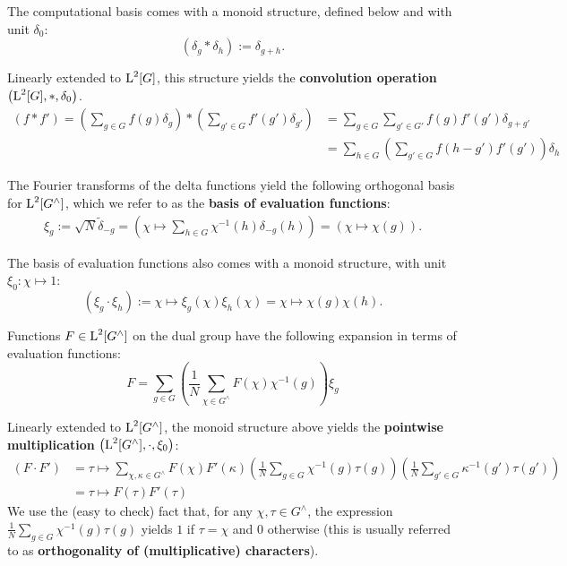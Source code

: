 The computational basis comes with a monoid structure, defined below and with unit $\delta_0$:
\begin{equation}
  \left(\delta_g*\delta_h\right):=\delta_{g+h}.
\end{equation}

Linearly extended to $\operatorname{L}^2[G]$, this structure yields the \textbf{convolution operation} $\left( \operatorname{L}^2[G],*,\delta_0 \right)$.
\begin{align}
\label{eqn:convolutionOperation}
\left(f * f'\right) = \left(\sum_{g\in G} f(g) \delta_g \right) * \left( \sum_{g' \in  G} f'(g') \delta_{g'} \right) &= \sum_{g\in G} \sum_{g'\in G'} f(g) f'(g') \delta_{g+g'} \\ 
&= \sum_{h\in G} \left(\sum_{g'\in G} f(h-g') f'(g')\right) \delta_h
\end{align}

The Fourier transforms of the delta functions yield the following orthogonal basis for $\operatorname{L}^2[G^\wedge]$, which we refer to as the \textbf{basis of evaluation functions}:
\begin{align*}
\xi_{g} := \sqrt{N}\tilde{\delta}_{-g} = \left(\chi \mapsto \sum_{h \in G}\chi^{-1}(h)\delta_{-g}(h) \right)= \left(\chi \mapsto \chi(g)\right).
\end{align*}

The basis of evaluation functions also comes with a monoid structure, with unit $\xi_0: \chi \mapsto 1$:
\begin{equation*}
  \left(\xi_g\cdot\xi_h\right):= \chi \mapsto \xi_g(\chi)\xi_h(\chi) = \chi \mapsto \chi(g)\chi(h).
\end{equation*}

Functions $F \in \operatorname{L}^2[G^\wedge]$ on the dual group have the following expansion in terms of evaluation functions:
\begin{equation*}
  F = \sum_{g\in G} \left( \frac{1}{N}\sum_{\chi \in G^\wedge} F(\chi) \chi^{-1}(g) \right) \xi_g
\end{equation*}

Linearly extended to $\operatorname{L}^2[G^\wedge]$, the monoid structure above yields the \textbf{pointwise multiplication} $\left( \operatorname{L}^2[G^\wedge],\cdot,\xi_0 \right)$: 
\begin{align}
\label{eqn:PointwiseMultCharacters}
  \left(F \cdot F' \right) &= \tau \mapsto \sum_{\chi,\kappa \in G^\wedge}  F(\chi)  F'(\kappa) \left(\frac{1}{N} \sum_{g\in G} \chi^{-1}(g)\tau(g)\right) \left(\frac{1}{N} \sum_{g'\in G}\kappa^{-1}(g') \tau(g') \right) \\ &= \tau \mapsto F(\tau) F'(\tau)
\end{align}
We use the (easy to check) fact that, for any $\chi,\tau \in G^\wedge$, the expression $\frac{1}{N} \sum_{g\in G}\chi^{-1}(g) \tau(g)$ yields $1$ if $\tau = \chi$ and $0$ otherwise (this is usually referred to as \textbf{orthogonality of (multiplicative) characters}).

